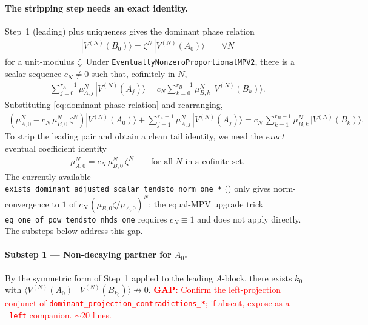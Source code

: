 \documentclass{article}
\newcommand{\leanid}[1]{\texttt{#1}}
\newcommand{\gap}[1]{\textcolor{red}{\textbf{GAP:} #1}}
\theoremstyle{plain}
\begin{document}
\paragraph{The stripping step needs an exact identity.}
Step~1 (leading) plus uniqueness gives the dominant phase relation
\begin{align}
    |V^{(N)}(B_0)\rangle = \zeta^N\,|V^{(N)}(A_0)\rangle
    \qquad \forall N
    \label{eq:dominant-phase-relation}
\end{align}
for a unit-modulus $\zeta$. Under
\leanid{EventuallyNonzeroProportionalMPV2}, there is a scalar sequence
$c_N \neq 0$ such that, cofinitely in $N$,
\begin{align}
    \sum_{j=0}^{r_A-1} \mu_{A,j}^N\,|V^{(N)}(A_j)\rangle
    = c_N \sum_{k=0}^{r_B-1} \mu_{B,k}^N\,|V^{(N)}(B_k)\rangle.
    \label{eq:proportional-restricted}
\end{align}
Substituting \eqref{eq:dominant-phase-relation} and rearranging,
\begin{align}
    (\mu_{A,0}^N - c_N\,\mu_{B,0}^N\,\zeta^N) |V^{(N)}(A_0)\rangle
                                                           {} + {} \sum_{j=1}^{r_A-1} \mu_{A,j}^N\, |V^{(N)}(A_j)\rangle
    = c_N\,\sum_{k=1}^{r_B-1} \mu_{B,k}^N\,|V^{(N)}(B_k)\rangle.
    \label{eq:rearranged}
\end{align}
To strip the leading pair and obtain a clean tail identity, we need the
\emph{exact} eventual coefficient identity
\begin{align}
    \mu_{A,0}^N = c_N\,\mu_{B,0}^N\,\zeta^N
    \qquad \text{for all $N$ in a cofinite set}.
    \label{eq:exact-leading-coefficient}
\end{align}
The currently available
\leanid{exists\_dominant\_adjusted\_scalar\_tendsto\_norm\_one\_*}
() only gives norm-convergence
to $1$ of $c_N\,(\mu_{B,0}\zeta/\mu_{A,0})^N$; the equal-MPV upgrade
trick \leanid{eq\_one\_of\_pow\_tendsto\_nhds\_one} requires $c_N
    \equiv 1$ and does not apply directly. The substeps below address this
gap.

\paragraph{Substep 1 --- Non-decaying partner for $A_0$.}
By the symmetric form of Step~1 applied to the leading $A$-block,
there exists $k_0$ with $\langle V^{(N)}(A_0) \mid V^{(N)}(B_{k_0})
    \rangle \not\to 0$.
\gap{Confirm the left-projection conjunct of
    \leanid{dominant\_projection\_contradictions\_*}; if absent, expose as
    a \texttt{\_left} companion. $\sim 20$ lines.}
\end{document}
